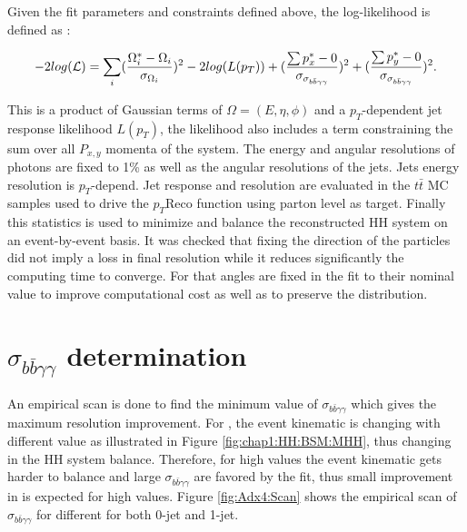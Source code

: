 Given the fit parameters and constraints defined above, the log-likelihood is defined as :

\begin{equation}
    \centering
    -2log(\mathcal{L}) = \sum_{i} (\frac{\Omega_i^*-\Omega_i}{\sigma_{\Omega_i}})^2 - 2log(L(p_T)) + (\frac{ \sum p_x^*-0}{\sigma_{\sigma_{b\bar{b}\gamma\gamma}}})^2 + (\frac{ \sum p_y^*-0}{\sigma_{\sigma_{b\bar{b}\gamma\gamma}}})^2.
\end{equation}

This is a product of Gaussian terms of $\Omega = (E, \eta, \phi)$ and a $p_T$-dependent jet response likelihood $L(p_T)$, the likelihood also includes a term constraining the sum over all $P_{x,y}$ momenta of the system. The energy and angular resolutions of photons are fixed to 1\% as well as the angular resolutions of the jets. Jets energy resolution is $p_T$-depend. Jet response and resolution are evaluated in the $t\bar{t}$ MC samples used to drive the $p_T$Reco function using parton level as target. Finally this statistics is used to minimize and balance the reconstructed HH system on an event-by-event basis. It was checked that fixing the direction of the particles did not imply a loss in final resolution while it reduces significantly the computing time to converge. For that angles are fixed in the fit to their nominal value to improve computational cost as well as to preserve the \myy distribution.  
\section{$\sigma_{b\bar{b}\gamma\gamma}$ determination}
An empirical scan is done to find the minimum value of $\sigma_{b\bar{b}\gamma\gamma}$ which gives the maximum \mbb resolution improvement. For \HHyybb, the event kinematic is changing with different \kl value as illustrated in Figure \ref{fig:chap1:HH:BSM:MHH}, thus changing in the HH system balance. Therefore, for high \kl values the event kinematic gets harder to balance and large $\sigma_{b\bar{b}\gamma\gamma}$ are favored by the fit, thus small improvement in \mbb is expected for high \kl values. Figure \ref{fig:Adx4:Scan} shows the empirical scan of $\sigma_{b\bar{b}\gamma\gamma}$ for different \kl for both 0-jet and 1-jet. 

